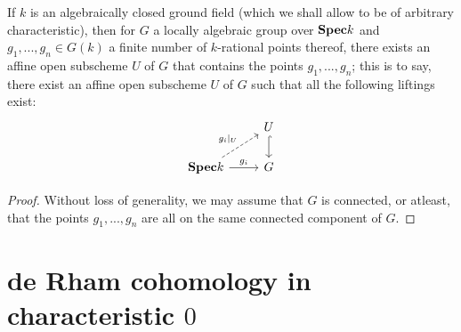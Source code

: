                 \begin{proposition}
                    If $k$ is an algebraically closed ground field (which we shall allow to be of arbitrary characteristic), then for $G$ a locally algebraic group over $\mathbf{Spec} k$ and $g_1, ..., g_n \in G(k)$ a finite number of $k$-rational points thereof, there exists an affine open subscheme $U$ of $G$ that contains the points $g_1, ..., g_n$; this is to say, there exist an affine open subscheme $U$ of $G$ such that all the following liftings exist:
                        $$
                            \begin{tikzcd}
                            	& U \\
                            	{\Spec k} & G
                            	\arrow[hook, from=1-2, to=2-2]
                            	\arrow["{g_i}", from=2-1, to=2-2]
                            	\arrow["{g_i|_U}", dashed, from=2-1, to=1-2]
                            \end{tikzcd}
                        $$
                \end{proposition}
                    \begin{proof}
                        Without loss of generality, we may assume that $G$ is connected, or atleast, that the points $g_1, ..., g_n$ are all on the same connected component of $G$.   
                    \end{proof}
            
    \section{de Rham cohomology in characteristic \texorpdfstring{$0$}{}} \label{section: de_rham_cohomology}